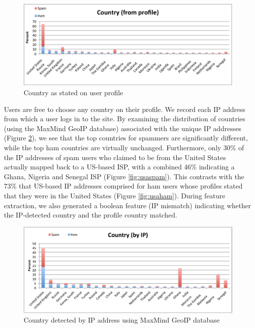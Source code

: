 \documentclass[preprint]{acm_proc_article-sp}
\begin{document}
\begin{figure}[h]
    \centering
    \includegraphics[width=\linewidth]{figures/country-prof.pdf}
    \caption{Country as stated on user profile}
    \label{fig:cprof}
\end{figure}

Users are free to choose any country on their profile. We record each IP address from which a 
user logs in to the site. By examining the distribution of countries (using the MaxMind GeoIP
database\cite{maxmind}) associated with the unique IP addresses (Figure \ref{fig:cip}), we see that the top 
countries for spammers are significantly different, while the top ham countries are 
virtually unchanged. Furthermore, only 30\% of the IP addresses of spam users who 
claimed to be from the United States actually mapped back to a US-based ISP, with a combined 
46\% indicating a Ghana, Nigeria and Senegal ISP (Figure \ref{fig:usaspam}). This contrasts 
with the 73\% that US-based IP addresses comprised for ham users whose profiles stated that 
they were in the United States (Figure \ref{fig:usaham}). During feature extraction, we also 
generated a boolean feature (IP mismatch) indicating whether the IP-detected country and 
the profile country matched. 

\begin{figure}[h]
    \centering
    \includegraphics[width=\linewidth]{figures/country-ip.pdf}
    \caption{Country detected by IP address using MaxMind GeoIP database}
    \label{fig:cip}
\end{figure}
\end{document}
